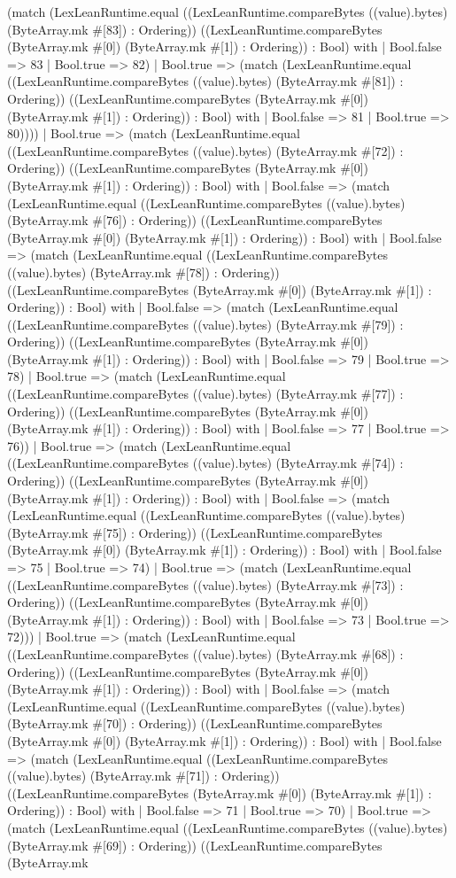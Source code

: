 \documentclass[11pt]{article}
\begin{document}
(match (LexLeanRuntime.equal ((LexLeanRuntime.compareBytes ((value).bytes) (ByteArray.mk \#[83]) : Ordering)) ((LexLeanRuntime.compareBytes (ByteArray.mk \#[0]) (ByteArray.mk \#[1]) : Ordering)) : Bool) with | Bool.false => 83 | Bool.true => 82) | Bool.true => (match (LexLeanRuntime.equal ((LexLeanRuntime.compareBytes ((value).bytes) (ByteArray.mk \#[81]) : Ordering)) ((LexLeanRuntime.compareBytes (ByteArray.mk \#[0]) (ByteArray.mk \#[1]) : Ordering)) : Bool) with | Bool.false => 81 | Bool.true => 80)))) | Bool.true => (match (LexLeanRuntime.equal ((LexLeanRuntime.compareBytes ((value).bytes) (ByteArray.mk \#[72]) : Ordering)) ((LexLeanRuntime.compareBytes (ByteArray.mk \#[0]) (ByteArray.mk \#[1]) : Ordering)) : Bool) with | Bool.false => (match (LexLeanRuntime.equal ((LexLeanRuntime.compareBytes ((value).bytes) (ByteArray.mk \#[76]) : Ordering)) ((LexLeanRuntime.compareBytes (ByteArray.mk \#[0]) (ByteArray.mk \#[1]) : Ordering)) : Bool) with | Bool.false => (match (LexLeanRuntime.equal ((LexLeanRuntime.compareBytes ((value).bytes) (ByteArray.mk \#[78]) : Ordering)) ((LexLeanRuntime.compareBytes (ByteArray.mk \#[0]) (ByteArray.mk \#[1]) : Ordering)) : Bool) with | Bool.false => (match (LexLeanRuntime.equal ((LexLeanRuntime.compareBytes ((value).bytes) (ByteArray.mk \#[79]) : Ordering)) ((LexLeanRuntime.compareBytes (ByteArray.mk \#[0]) (ByteArray.mk \#[1]) : Ordering)) : Bool) with | Bool.false => 79 | Bool.true => 78) | Bool.true => (match (LexLeanRuntime.equal ((LexLeanRuntime.compareBytes ((value).bytes) (ByteArray.mk \#[77]) : Ordering)) ((LexLeanRuntime.compareBytes (ByteArray.mk \#[0]) (ByteArray.mk \#[1]) : Ordering)) : Bool) with | Bool.false => 77 | Bool.true => 76)) | Bool.true => (match (LexLeanRuntime.equal ((LexLeanRuntime.compareBytes ((value).bytes) (ByteArray.mk \#[74]) : Ordering)) ((LexLeanRuntime.compareBytes (ByteArray.mk \#[0]) (ByteArray.mk \#[1]) : Ordering)) : Bool) with | Bool.false => (match (LexLeanRuntime.equal ((LexLeanRuntime.compareBytes ((value).bytes) (ByteArray.mk \#[75]) : Ordering)) ((LexLeanRuntime.compareBytes (ByteArray.mk \#[0]) (ByteArray.mk \#[1]) : Ordering)) : Bool) with | Bool.false => 75 | Bool.true => 74) | Bool.true => (match (LexLeanRuntime.equal ((LexLeanRuntime.compareBytes ((value).bytes) (ByteArray.mk \#[73]) : Ordering)) ((LexLeanRuntime.compareBytes (ByteArray.mk \#[0]) (ByteArray.mk \#[1]) : Ordering)) : Bool) with | Bool.false => 73 | Bool.true => 72))) | Bool.true => (match (LexLeanRuntime.equal ((LexLeanRuntime.compareBytes ((value).bytes) (ByteArray.mk \#[68]) : Ordering)) ((LexLeanRuntime.compareBytes (ByteArray.mk \#[0]) (ByteArray.mk \#[1]) : Ordering)) : Bool) with | Bool.false => (match (LexLeanRuntime.equal ((LexLeanRuntime.compareBytes ((value).bytes) (ByteArray.mk \#[70]) : Ordering)) ((LexLeanRuntime.compareBytes (ByteArray.mk \#[0]) (ByteArray.mk \#[1]) : Ordering)) : Bool) with | Bool.false => (match (LexLeanRuntime.equal ((LexLeanRuntime.compareBytes ((value).bytes) (ByteArray.mk \#[71]) : Ordering)) ((LexLeanRuntime.compareBytes (ByteArray.mk \#[0]) (ByteArray.mk \#[1]) : Ordering)) : Bool) with | Bool.false => 71 | Bool.true => 70) | Bool.true => (match (LexLeanRuntime.equal ((LexLeanRuntime.compareBytes ((value).bytes) (ByteArray.mk \#[69]) : Ordering)) ((LexLeanRuntime.compareBytes (ByteArray.mk 
\end{document}
